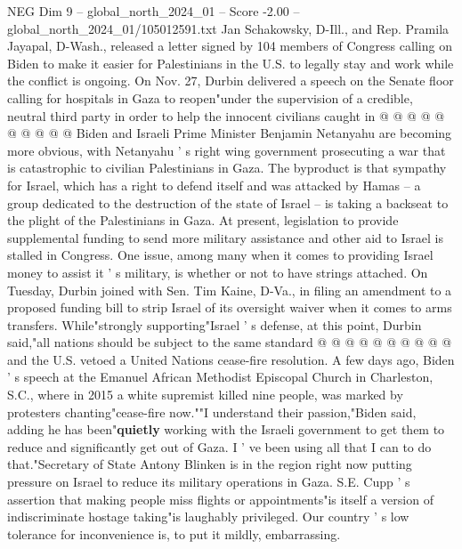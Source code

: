 \begin{textsample}{NEG Dim 9 – global\_north\_2024\_01 – Score -2.00 – global\_north\_2024\_01/105012591.txt}
Jan Schakowsky, D-Ill., and Rep.
Pramila Jayapal, D-Wash., released a letter signed by 104 members of Congress calling on Biden to make it easier for Palestinians in the U.S. to legally stay and work while the conflict is ongoing.
On Nov. 27, Durbin delivered a speech on the Senate floor calling for hospitals in Gaza to reopen"under the supervision of a credible, neutral third party in order to help the innocent civilians caught in @ @ @ @ @ @ @ @ @ @ Biden and Israeli Prime Minister Benjamin Netanyahu are becoming more obvious, with Netanyahu ' s right wing government prosecuting a war that is catastrophic to civilian Palestinians in Gaza.
The byproduct is that sympathy for Israel, which has a right to defend itself and was attacked by Hamas -- a group dedicated to the destruction of the state of Israel -- is taking a backseat to the plight of the Palestinians in Gaza.
At present, legislation to provide supplemental funding to send more military assistance and other aid to Israel is stalled in Congress.
One issue, among many when it comes to providing Israel money to assist it ' s military, is whether or not to have strings attached.
On Tuesday, Durbin joined with Sen.
Tim Kaine, D-Va., in filing an amendment to a proposed funding bill to strip Israel of its oversight waiver when it comes to arms transfers.
While"strongly supporting"Israel ' s defense, at this point, Durbin said,"all nations should be subject to the same standard @ @ @ @ @ @ @ @ @ @ and the U.S. vetoed a United Nations cease-fire resolution.
A few days ago, Biden ' s speech at the Emanuel African Methodist Episcopal Church in Charleston, S.C., where in 2015 a white supremist killed nine people, was marked by protesters chanting"cease-fire now.""I understand their passion,"Biden said, adding he has been"\textbf{quietly} working with the Israeli government to get them to reduce and significantly get out of Gaza.
I ' ve been using all that I can to do that."Secretary of State Antony Blinken is in the region right now putting pressure on Israel to reduce its military operations in Gaza.
S.E.
Cupp ' s assertion that making people miss flights or appointments"is itself a version of indiscriminate hostage taking"is laughably privileged.
Our country ' s low tolerance for inconvenience is, to put it mildly, embarrassing.

\end{textsample}
